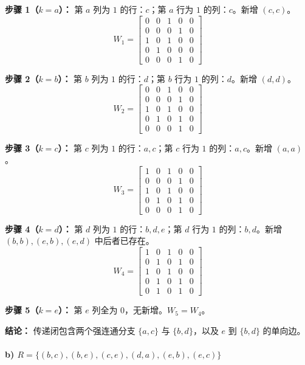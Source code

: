 \documentclass[11pt,UTF8]{article}
\begin{document}
\textbf{步骤 1（$k=a$）：} 第 $a$ 列为 $1$ 的行：$c$；第 $a$ 行为 $1$ 的列：$c$。新增 $(c,c)$。
\[
W_1 = \begin{bmatrix}
0 & 0 & 1 & 0 & 0 \\
0 & 0 & 0 & 1 & 0 \\
1 & 0 & 1 & 0 & 0 \\
0 & 1 & 0 & 0 & 0 \\
0 & 0 & 0 & 1 & 0
\end{bmatrix}
\]

\textbf{步骤 2（$k=b$）：} 第 $b$ 列为 $1$ 的行：$d$；第 $b$ 行为 $1$ 的列：$d$。新增 $(d,d)$。
\[
W_2 = \begin{bmatrix}
0 & 0 & 1 & 0 & 0 \\
0 & 0 & 0 & 1 & 0 \\
1 & 0 & 1 & 0 & 0 \\
0 & 1 & 0 & 1 & 0 \\
0 & 0 & 0 & 1 & 0
\end{bmatrix}
\]

\textbf{步骤 3（$k=c$）：} 第 $c$ 列为 $1$ 的行：$a,c$；第 $c$ 行为 $1$ 的列：$a,c$。新增 $(a,a)$。
\[
W_3 = \begin{bmatrix}
1 & 0 & 1 & 0 & 0 \\
0 & 0 & 0 & 1 & 0 \\
1 & 0 & 1 & 0 & 0 \\
0 & 1 & 0 & 1 & 0 \\
0 & 0 & 0 & 1 & 0
\end{bmatrix}
\]

\textbf{步骤 4（$k=d$）：} 第 $d$ 列为 $1$ 的行：$b,d,e$；第 $d$ 行为 $1$ 的列：$b,d$。新增 $(b,b),(e,b),(e,d)$ 中后者已存在。
\[
W_4 = \begin{bmatrix}
1 & 0 & 1 & 0 & 0 \\
0 & 1 & 0 & 1 & 0 \\
1 & 0 & 1 & 0 & 0 \\
0 & 1 & 0 & 1 & 0 \\
0 & 1 & 0 & 1 & 0
\end{bmatrix}
\]

\textbf{步骤 5（$k=e$）：} 第 $e$ 列全为 $0$，无新增。$W_5=W_4$。

\textbf{结论：} 传递闭包含两个强连通分支 $\{a,c\}$ 与 $\{b,d\}$，以及 $e$ 到 $\{b,d\}$ 的单向边。

\paragraph{b) $R = \{(b,c),(b,e),(c,e),(d,a),(e,b),(e,c)\}$}
\end{document}

